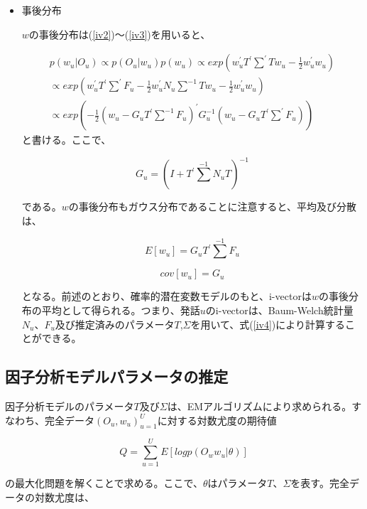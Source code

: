 \begin{itemize}
\item 事後分布\par
$w$の事後分布は(\ref{iv2})〜(\ref{iv3})を用いると、

\begin{equation}
\begin{split}
p(w_u|O_u)\propto p(O_u|w_u)p(w_u)\propto exp(w_u^\prime T^\prime \sum^\prime Tw_u-\frac{1}{2}w_u^\prime w_u)\\ \propto exp(w_u^\prime T^\prime \sum^\prime F_u-\frac{1}{2}w_u^\prime N_u\sum^{-1}Tw_u-\frac{1}{2}w_u^\prime w_u)\\ \propto exp(-\frac{1}{2}(w_u-G_uT^\prime\sum^{-1}F_u)^\prime G_u^{-1}(w_u-G_uT^\prime \sum^\prime F_u))
\end{split}
\end{equation}
と書ける。ここで、

\begin{equation}
G_u=(I+T^\prime \sum^{-1}N_u T)^{-1}
\end{equation}

である。$w$の事後分布もガウス分布であることに注意すると、平均及び分散は、

\begin{equation}
\label{iv4}
E[w_u]=G_uT^\prime \sum^{-1}F_u
\end{equation}

\begin{equation}
cov[w_u]=G_u
\end{equation}

となる。前述のとおり、確率的潜在変数モデルのもと、i-vectorは$w$の事後分布の平均として得られる。つまり、発話$u$のi-vectorは、Baum-Welch統計量$N_u$、$F_u$及び推定済みのパラメータ$T$,$\Sigma$を用いて、式(\ref{iv4})により計算することができる。

\end{itemize}


\subsection{因子分析モデルパラメータの推定}
因子分析モデルのパラメータ$T$及び$\Sigma$は、EMアルゴリズムにより求められる。すなわち、完全データ${(O_u,w_u)}_{u=1}^{U}$に対する対数尤度の期待値

\begin{equation}
\label{iv5}
Q=\sum_{u=1}^{U}E[log p(O_ww_u|\theta)]
\end{equation}

の最大化問題を解くことで求める。ここで、$\theta$はパラメータ$T$、$\Sigma$を表す。完全データの対数尤度は、


